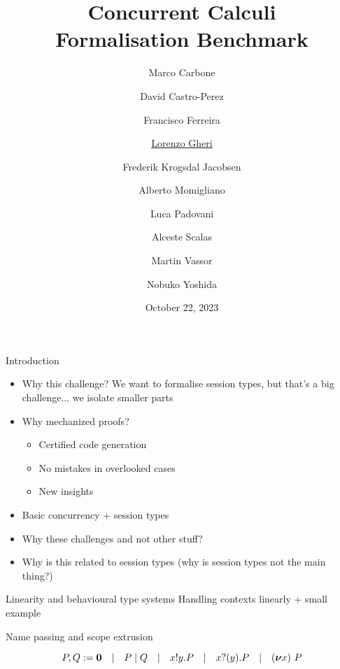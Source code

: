 \documentclass[aspectratio=169,hyperref={pdfpagelabels=false}]{beamer}
\title[Concurrent Calculi Formalisation Benchmark]{\texorpdfstring{Concurrent Calculi\\Formalisation Benchmark}{Concurrent Calculi Formalisation Benchmark}}
\author{Marco Carbone
\and David Castro-Perez
\and Francisco Ferreira
\and \texorpdfstring{\underline{Lorenzo Gheri}}{Lorenzo Gheri}
\and Frederik Krogsdal Jacobsen
\and Alberto Momigliano
\and Luca Padovani
\and Alceste Scalas
\and Martin Vassor
\and Nobuko Yoshida}
\date{October 22, 2023}
\begin{document}
\inserttitlepage

\begin{frame}{Introduction}
  \begin{itemize}
  \item Why this challenge? We want to formalise session types, but that's a big challenge... we isolate smaller parts
  \item Why mechanized proofs?
    \begin{itemize}
    \item Certified code generation
    \item No mistakes in overlooked cases
    \item New insights
    \end{itemize}
  \item Basic concurrency + session types
  \item Why these challenges and not other stuff?
  \item Why is this related to session types (why is session types not the main thing?)
  \end{itemize}
\end{frame}

\begin{frame}{Linearity and behavioural type systems}
  Handling contexts linearly + small example
\end{frame}

\begin{frame}{Name passing and scope extrusion}

  \[P,Q := \bm{0}\quad|\quad P \mid Q\quad|\quad x ! y . P\quad|\quad x ? (y) . P\quad|\quad (\bm{\nu} x)~P\]

  \ \\

  
      
\end{frame}
\end{document}
